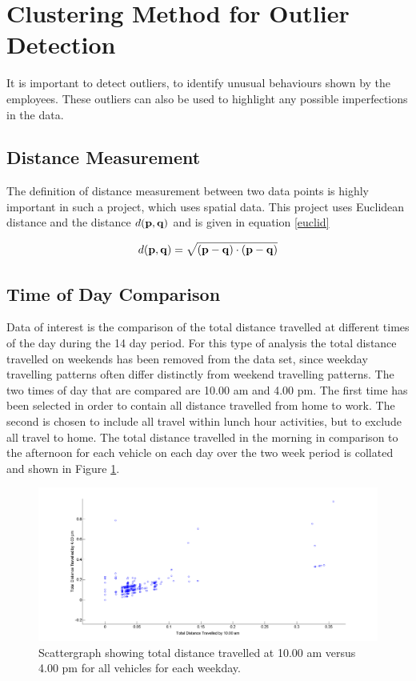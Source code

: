 \section{Clustering Method for Outlier Detection}
\label{sec:clusteroutlier}

It is important to detect outliers, to identify unusual behaviours shown by the employees. These outliers can also be used to highlight any possible imperfections in the data.

\subsection{Distance Measurement}
\label{sec:euclidean}

The definition of distance measurement between two data points is highly important in such a project, which uses spatial data. This project uses Euclidean distance and the distance $d(\bf{p},\bf{q})$ and is given in equation \ref{euclid}

\begin{equation}
\label{euclid}
d(\bf{p},\bf{q}) = \sqrt{(\bf{p}-\bf{q})\cdot(\bf{p}-\bf{q})}
\end{equation}



\subsection{Time of Day Comparison}
\label{sec:outliertimeday}

Data of interest is the comparison of the total distance travelled at different times of the day during the 14 day period. For this type of analysis the total distance travelled on weekends has been removed from the data set, since weekday travelling patterns often differ distinctly from weekend travelling patterns. The two times of day that are compared are 10.00 am and 4.00 pm. The first time has been selected in order to contain all distance travelled from home to work. The second is chosen to include all travel within lunch hour activities, but to exclude all travel to home. The total distance travelled in the morning in comparison to the afternoon for each vehicle on each day over the two week period is collated and shown in Figure \ref{fig:mornaft}. 

\begin{figure}[!ht]
\centering
\includegraphics[width=1.1\textwidth]{Images/1stoutlier.png}
\caption{\label{fig:mornaft}Scattergraph showing total distance travelled at 10.00 am versus 4.00 pm for all vehicles for each weekday.}
\end{figure}

